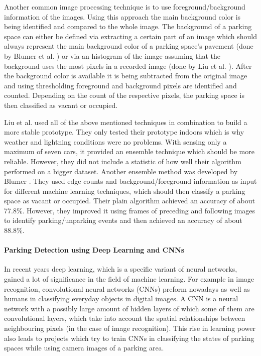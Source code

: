Another common image processing technique is to use foreground/background information of the images. Using this approach the main background color is being identified and compared to the whole image. The background of a parking space can either be defined via extracting a certain part of an image which should always represent the main background color of a parking space's pavement (done by Blumer et al. \cite{Blumer2012}) or via an histogram of the image assuming that the background uses the most pixels in a recorded image (done by Liu et al. \cite{stationary_camera_sensing}). After the background color is available it is being subtracted from the original image and using thresholding foreground and background pixels are identified and counted. Depending on the count of the respective pixels, the parking space is then classified as vacant or occupied.

Liu et al. \cite{stationary_camera_sensing} used all of the above mentioned techniques in combination to build a more stable prototype. They only tested their prototype indoors which is why weather and lightning conditions were no problems. With sensing only a maximum of seven cars, it provided an ensemble technique which should be more reliable. However, they did not include a statistic of how well their algorithm performed on a bigger dataset. Another ensemble method was developed by Blumer \cite{Blumer2012}. They used edge counts and background/foreground information as input for different machine learning techniques, which should then classify a parking space as vacant or occupied. Their plain algorithm achieved an accuracy of about 77.8\%. However, they improved it using frames of preceding and following images to identify parking/unparking events and then achieved an accuracy of about 88.8\%.


\paragraph{Parking Detection using Deep Learning and CNNs}

In recent years deep learning, which is a specific variant of neural networks, gained a lot of significance in the field of machine learning. For example in image recognition, convolutional neural networks (CNNs) preform nowadays as well as humans in classifying everyday objects in digital images. A CNN is a neural network with a possibly large amount of hidden layers of which some of them are convolutional layers, which take into account the spatial relationships between neighbouring pixels (in the case of image recognition). This rise in learning power also leads to projects which try to train CNNs in classifying the states of parking spaces while using camera images of a parking area.

